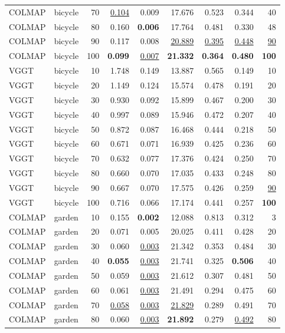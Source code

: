 \begin{table}[H]
\begin{tabular}{llrrrrrrr}
COLMAP & bicycle & 70 & \underline{0.104} & 0.009 & 17.676 & 0.523 & 0.344 & 40 \\
COLMAP & bicycle & 80 & 0.160 & \textbf{0.006} & 17.764 & 0.481 & 0.330 & 48 \\
COLMAP & bicycle & 90 & 0.117 & 0.008 & \underline{20.889} & \underline{0.395} & \underline{0.448} & \underline{90} \\
COLMAP & bicycle & 100 & \textbf{0.099} & \underline{0.007} & \textbf{21.332} & \textbf{0.364} & \textbf{0.480} & \textbf{100} \\
VGGT & bicycle & 10 & 1.748 & 0.149 & 13.887 & 0.565 & 0.149 & 10 \\
VGGT & bicycle & 20 & 1.149 & 0.124 & 15.574 & 0.478 & 0.191 & 20 \\
VGGT & bicycle & 30 & 0.930 & 0.092 & 15.899 & 0.467 & 0.200 & 30 \\
VGGT & bicycle & 40 & 0.997 & 0.089 & 15.946 & 0.472 & 0.207 & 40 \\
VGGT & bicycle & 50 & 0.872 & 0.087 & 16.468 & 0.444 & 0.218 & 50 \\
VGGT & bicycle & 60 & 0.671 & 0.071 & 16.939 & 0.425 & 0.236 & 60 \\
VGGT & bicycle & 70 & 0.632 & 0.077 & 17.376 & 0.424 & 0.250 & 70 \\
VGGT & bicycle & 80 & 0.660 & 0.070 & 17.035 & 0.433 & 0.248 & 80 \\
VGGT & bicycle & 90 & 0.667 & 0.070 & 17.575 & 0.426 & 0.259 & \underline{90} \\
VGGT & bicycle & 100 & 0.716 & 0.066 & 17.174 & 0.441 & 0.257 & \textbf{100} \\
\midrule
COLMAP & garden & 10 & 0.155 & \textbf{0.002} & 12.088 & 0.813 & 0.312 & 3 \\
COLMAP & garden & 20 & 0.071 & 0.005 & 20.025 & 0.411 & 0.428 & 20 \\
COLMAP & garden & 30 & 0.060 & \underline{0.003} & 21.342 & 0.353 & 0.484 & 30 \\
COLMAP & garden & 40 & \textbf{0.055} & \underline{0.003} & 21.741 & 0.325 & \textbf{0.506} & 40 \\
COLMAP & garden & 50 & 0.059 & \underline{0.003} & 21.612 & 0.307 & 0.481 & 50 \\
COLMAP & garden & 60 & 0.061 & \underline{0.003} & 21.491 & 0.294 & 0.475 & 60 \\
COLMAP & garden & 70 & \underline{0.058} & \underline{0.003} & \underline{21.829} & 0.289 & 0.491 & 70 \\
COLMAP & garden & 80 & 0.060 & \underline{0.003} & \textbf{21.892} & 0.279 & \underline{0.492} & 80 \\

\end{tabular}
\end{table}
